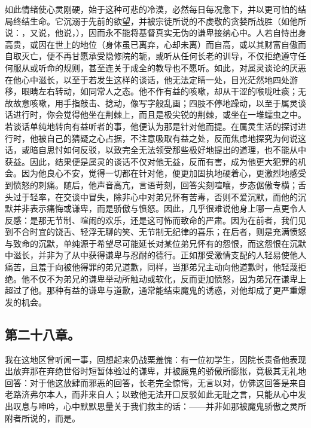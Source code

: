 \par

如此情绪使心灵刚硬，始于这种可悲的冷漠，必然每日每况愈下，并以更可怕的结局终结生命。它沉溺于先前的欲望，并被宗徒所说的不虔敬的贪婪所战胜（如他所说：，又说，他说，），因而永不能将基督真实无伪的谦卑接纳心中。人若自恃出身高贵，或因在世上的地位（身体虽已离弃，心却未离）而自高，或以其财富自傲而自取灭亡，便不再甘愿承受隐修院的轭，或听从任何长老的训导，不仅拒绝遵守任何服从或听命的规则，甚至连关于成全的教导也不愿听。如此，对属灵谈论的厌恶在他心中滋长，以至于若发生这样的谈话，他无法定睛一处，目光茫然地四处游移，眼睛左右转动，如同常人之态。他不作有益的咳嗽，却从干涩的喉咙吐痰；无故故意咳嗽，用手指敲击、捻动，像写字般乱画；四肢不停地躁动，以至于属灵谈话进行时，你会觉得他坐在荆棘上，而且是极尖锐的荆棘，或坐在一堆蠕虫之中。若谈话单纯地转向有益听者的事，他便认为那是针对他而提。在属灵生活的探讨进行时，他被自己的猜疑之心占据，不注意吸取有益之处，反而焦虑地探究为何说这话，或暗自思忖如何反驳，以致完全无法领受那些极好地提出的道理，也不能从中获益。因此，结果便是属灵的谈话不仅对他无益，反而有害，成为他更大犯罪的机会。因为他良心不安，觉得一切都在针对他，便更加固执地硬着心，更激烈地感受到愤怒的刺痛。随后，他声音高亢，言语苛刻，回答尖刻喧嚷，步态倨傲专横；舌头过于轻率，在交谈中冒失，除非心中对弟兄怀有苦毒，否则不爱沉默，而他的沉默并非表示痛悔或谦卑，而是骄傲与愤怒。因此，几乎很难说他身上哪一点更令人反感：是那无节制、喧闹的欢乐，还是这可怖而致命的严肃。因为在前者，我们见到不合时宜的饶舌、轻浮无聊的笑、无节制无纪律的喜乐；在后者，则是充满愤怒与致命的沉默，单纯源于希望尽可能延长对某位弟兄怀有的怨恨，而这怨恨在沉默中滋长，并非为了从中获得谦卑与忍耐的德行。正如那受激情支配的人轻易使他人痛苦，且羞于向被他得罪的弟兄道歉，同样，当那弟兄主动向他道歉时，他轻蔑拒绝。他不仅不为弟兄的谦卑举动所触动或软化，反而更加愤怒，因为弟兄在谦卑上超过了他。那种有益的谦卑与道歉，通常能结束魔鬼的诱惑，对他却成了更严重爆发的机会。\par


\subsection{第二十八章。}

\par

我在这地区曾听闻一事，回想起来仍战栗羞愧：有一位初学生，因院长责备他表现出放弃那在弃绝世俗时短暂体验过的谦卑，并被魔鬼的骄傲所膨胀，竟极其无礼地回答：对于他这放肆而邪恶的回答，长老完全惊愕，无言以对，仿佛这回答是来自老路济弗尔本人，而非来自人；以致他无法开口反驳如此无耻之言，只能从心中发出叹息与呻吟，心中默默思量关于我们救主的话：——并非如那被魔鬼骄傲之灵所附者所说的，而是。\par

